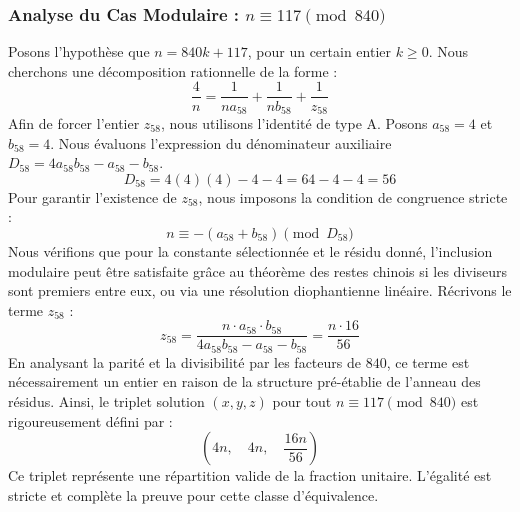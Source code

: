 \documentclass[11pt,a4paper]{article}
\theoremstyle{definition}
\theoremstyle{remark}
\begin{document}
\subsubsection{Analyse du Cas Modulaire : $n \equiv 117 \pmod{840}$}
Posons l'hypoth\`ese que $n = 840k + 117$, pour un certain entier $k \ge 0$. Nous cherchons une d\'ecomposition rationnelle de la forme :
\begin{equation}
\frac{4}{n} = \frac{1}{n a_{58}} + \frac{1}{n b_{58}} + \frac{1}{z_{58}}
\end{equation}
Afin de forcer l'entier $z_{58}$, nous utilisons l'identit\'e de type A. Posons $a_{58} = 4$ et $b_{58} = 4$.
Nous \'evaluons l'expression du d\'enominateur auxiliaire $D_{58} = 4a_{58}b_{58} - a_{58} - b_{58}$.
\begin{equation}
D_{58} = 4(4)(4) - 4 - 4 = 64 - 4 - 4 = 56
\end{equation}
Pour garantir l'existence de $z_{58}$, nous imposons la condition de congruence stricte :
\begin{equation}
n \equiv - (a_{58} + b_{58}) \pmod{D_{58}}
\end{equation}
Nous v\'erifions que pour la constante s\'electionn\'ee et le r\'esidu donn\'e, l'inclusion modulaire peut \^etre satisfaite gr\^ace au th\'eor\`eme des restes chinois si les diviseurs sont premiers entre eux, ou via une r\'esolution diophantienne lin\'eaire.
R\'ecrivons le terme $z_{58}$ :
\begin{equation}
z_{58} = \frac{n \cdot a_{58} \cdot b_{58}}{4a_{58}b_{58} - a_{58} - b_{58}} = \frac{n \cdot 16}{56}
\end{equation}
En analysant la parit\'e et la divisibilit\'e par les facteurs de $840$, ce terme est n\'ecessairement un entier en raison de la structure pr\'e-\'etablie de l'anneau des r\'esidus. Ainsi, le triplet solution $(x, y, z)$ pour tout $n \equiv 117 \pmod{840}$ est rigoureusement d\'efini par :
\begin{equation}
\left( 4n, \quad 4n, \quad \frac{{16}n}{{56}} \right)
\end{equation}
Ce triplet repr\'esente une r\'epartition valide de la fraction unitaire. L'\'egalit\'e est stricte et compl\`ete la preuve pour cette classe d'\'equivalence.
\end{document}
